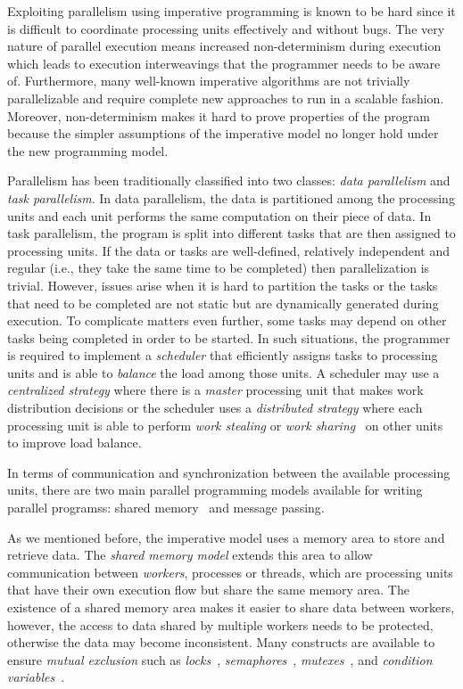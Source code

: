 Exploiting parallelism using imperative programming is known to be hard since it
is difficult to coordinate processing units effectively and without bugs. The
very nature of parallel execution means increased non-determinism during
execution which leads to execution interweavings that the programmer needs to be
aware of. Furthermore, many well-known imperative algorithms are not trivially
parallelizable and require complete new approaches to run in a scalable fashion.
Moreover, non-determinism makes it hard to prove properties of the program
because the simpler assumptions of the imperative model no longer hold under the
new programming model.

Parallelism has been traditionally classified into two classes: \emph{data
parallelism} and \emph{task parallelism}. In data parallelism, the data is
partitioned among the processing units and each unit performs the same
computation on their piece of data. In task parallelism, the program is split
into different tasks that are then assigned to processing units. If the data or
tasks are well-defined, relatively independent and regular (i.e., they take the
same time to be completed) then parallelization is trivial. However, issues
arise when it is hard to partition the tasks or the tasks that need to be
completed are not static but are dynamically generated during execution. To
complicate matters even further, some tasks may depend on other tasks being
completed in order to be started. In such situations, the programmer is required
to implement a \emph{scheduler} that efficiently assigns tasks to processing
units and is able to \emph{balance} the load among those units. A scheduler may
use a \emph{centralized strategy} where there is a \emph{master} processing unit
that makes work distribution decisions or the scheduler uses a \emph{distributed
strategy} where each processing unit is able to perform \emph{work stealing} or
\emph{work sharing}~\cite{Blumofe:1999} on other units to improve load balance.

In terms of communication and synchronization between the available processing
units, there are two main parallel programming models available for writing
parallel programss: shared memory~\cite{Mellor-Crummey:1991} and message passing.

As we mentioned before, the imperative model uses a memory area to store and
retrieve data. The \emph{shared memory model} extends this area to allow
communication between \emph{workers}, processes or threads, which are processing
units that have their own execution flow but share the same memory area. The
existence of a shared memory area makes it easier to share data between workers,
however, the access to data shared by multiple workers needs to be protected,
otherwise the data may become inconsistent. Many constructs are available to
ensure \emph{mutual exclusion} such as \emph{locks}~\cite{Silberschatz:2008},
\emph{semaphores}~\cite{Dijkstra:2002}, \emph{mutexes}~\cite{Silberschatz:2008},
and \emph{condition variables}~\cite{Hoare:1974}.

